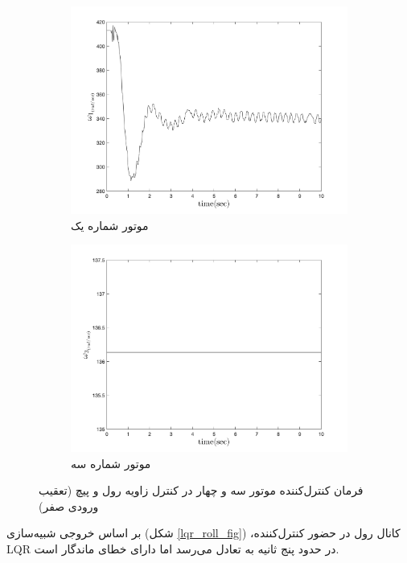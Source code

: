 \begin{figure}
	[width=12cm]
	\centering
	\begin{subfigure}
		\centering
		\includegraphics[width=12cm]{../Figures/Calibration/LQR/Pitch/lqr_pitch_Omega_1.png}
		\caption{موتور شماره یک}
	\end{subfigure}
	\begin{subfigure}
		\centering
		\includegraphics[width=12cm]{../Figures/Calibration/LQR/Pitch/lqr_pitch_Omega_3.png}
		\caption{موتور شماره سه}
	\end{subfigure}
	\caption{‫‪فرمان کنترل‌کننده موتور سه و چهار در کنترل زاویه رول و پیچ (تعقیب ورودی صفر)}
\end{figure}
بر اساس خروجی شبیه‌سازی (شکل
\ref{lqr_roll_fig})
،کانال رول در حضور کنترل‌کننده LQR در حدود پنج ثانیه به تعادل می‌رسد اما دارای خطای ماندگار است. 